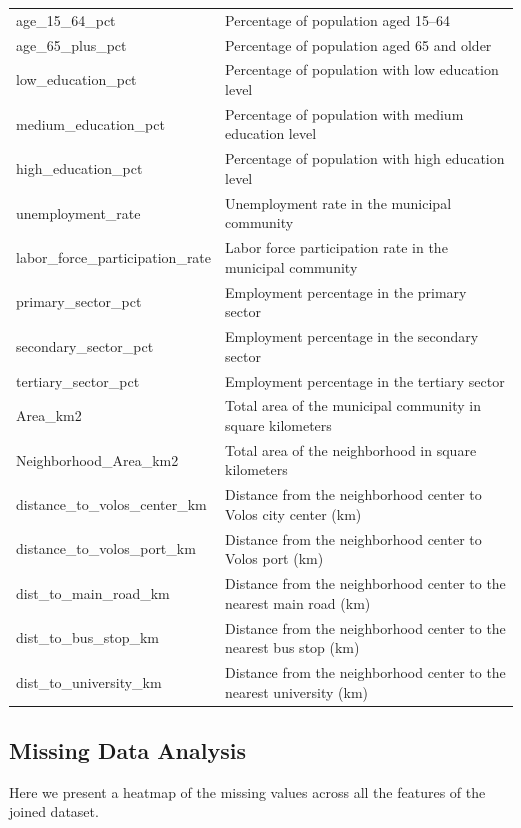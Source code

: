 \begin{longtable}{p{5cm} p{10cm}}
    age\_15\_64\_pct & Percentage of population aged 15–64 \\
    age\_65\_plus\_pct & Percentage of population aged 65 and older \\
    low\_education\_pct & Percentage of population with low education level \\
    medium\_education\_pct & Percentage of population with medium education level \\
    high\_education\_pct & Percentage of population with high education level \\
    unemployment\_rate & Unemployment rate in the municipal community \\
    labor\_force\_participation\_rate & Labor force participation rate in the municipal community \\
    primary\_sector\_pct & Employment percentage in the primary sector\\ 
    secondary\_sector\_pct & Employment percentage in the secondary sector \\
    tertiary\_sector\_pct & Employment percentage in the tertiary sector \\
    Area\_km2 & Total area of the municipal community in square kilometers \\
    Neighborhood\_Area\_km2 & Total area of the neighborhood in square kilometers \\
    distance\_to\_volos\_center\_km & Distance from the neighborhood center to Volos city center (km) \\
    distance\_to\_volos\_port\_km & Distance from the neighborhood center to Volos port (km) \\
    dist\_to\_main\_road\_km & Distance from the neighborhood center to the nearest main road (km) \\
    dist\_to\_bus\_stop\_km & Distance from the neighborhood center to the nearest bus stop (km) \\
    dist\_to\_university\_km & Distance from the neighborhood center to the nearest university (km) \\
\end{longtable}


\subsection{Missing Data Analysis}

Here we present a heatmap of the missing values across all the features of the joined dataset.

